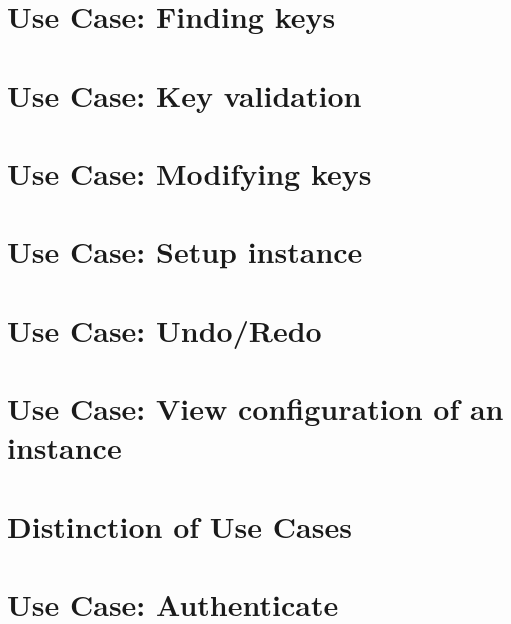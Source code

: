 \documentclass[twoside]{book}
\newcommand{\+}{\discretionary{\mbox{\scriptsize$\hookleftarrow$}}{}{}}
\begin{document}
\chapter{Use Case\+: Finding keys}
\label{doc_usecases_elektra_web_UC_finding_keys_md}

\chapter{Use Case\+: Key validation}
\label{doc_usecases_elektra_web_UC_key_validation_md}

\chapter{Use Case\+: Modifying keys}
\label{doc_usecases_elektra_web_UC_modifying_keys_md}

\chapter{Use Case\+: Setup instance}
\label{doc_usecases_elektra_web_UC_setup_instance_md}

\chapter{Use Case\+: Undo/\+Redo}
\label{doc_usecases_elektra_web_UC_undo_redo_md}

\chapter{Use Case\+: View configuration of an instance}
\label{doc_usecases_elektra_web_UC_view_config_md}

\chapter{Distinction of Use Cases}
\label{doc_usecases_snippet_sharing_distinction_use_cases_md}

\chapter{Use Case\+: Authenticate}
\label{doc_usecases_snippet_sharing_UC_authenticate_md}

\end{document}
